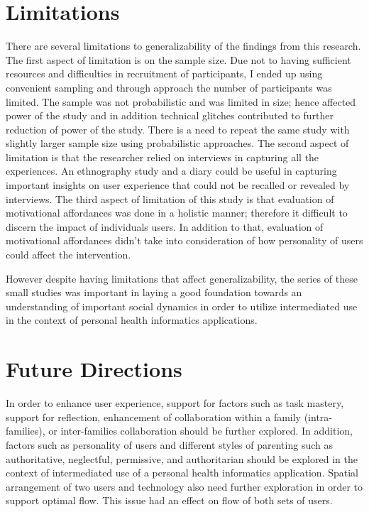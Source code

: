 \section{Limitations}
There are several limitations to generalizability of the findings from this research. The first aspect of limitation is on the sample size. Due not to having sufficient resources and difficulties in recruitment of participants, I ended up using convenient sampling and through approach the number of participants was limited. The sample was not probabilistic and was limited in size; hence affected power of the study and in addition technical glitches contributed to further reduction of power of the study. There is a need to repeat the same study with slightly larger sample size using probabilistic approaches.   The second aspect of limitation is that the researcher relied on interviews in capturing all the experiences. An ethnography study and a diary could be useful in capturing important insights on user experience that could not be recalled or revealed by interviews. The third aspect of limitation of this study is that evaluation of motivational affordances was done in a holistic manner; therefore it difficult to discern the impact of individuals users. In addition to that, evaluation of motivational affordances didn't take into consideration of how personality of users could affect the intervention.  

However despite having limitations that affect generalizability, the series of these small studies was important in laying a good foundation towards an understanding of important social dynamics in order to utilize intermediated use in the context of personal health informatics applications.

\section{Future Directions}
In order to enhance user experience, support for factors such as task mastery, support for reflection, enhancement of collaboration within a family (intra-families), or inter-families collaboration should be further explored. In addition, factors such as personality of users and different styles of parenting such as authoritative, neglectful, permissive, and authoritarian should be explored in the context of intermediated use of a personal health informatics application. Spatial arrangement of two users and technology also need further exploration in order to support optimal flow. This issue had an effect on flow of both sets of users. 

